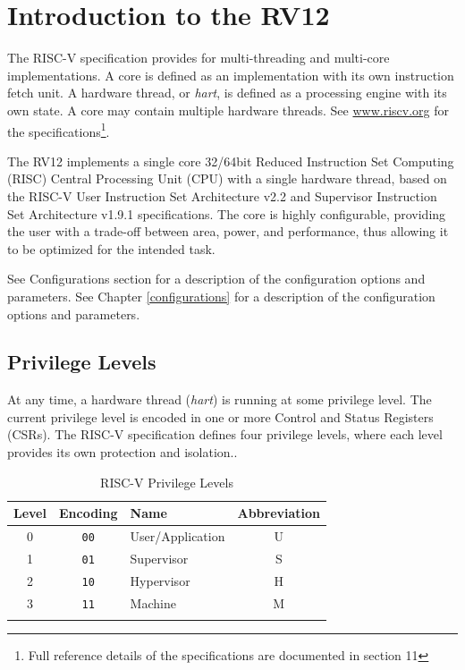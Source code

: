 \chapter{Introduction to the RV12} \label{introduction-to-the-rv12}

The RISC-V specification provides for multi-threading and multi-core implementations. 
A core is defined as an implementation with its own instruction fetch unit. 
A hardware thread, or \emph{hart}, is defined as a processing engine with its own state. 
A core may contain multiple hardware threads. 
See \href{http://www.riscv.org}{www.riscv.org} for the specifications\footnote{Full reference details of the specifications are documented in section 11}.

The RV12 implements a single core 32/64bit Reduced Instruction Set Computing (RISC) Central Processing Unit (CPU) with a single hardware thread, based on the RISC-V User Instruction Set Architecture v2.2 and Supervisor Instruction Set Architecture v1.9.1 specifications. 
The core is highly configurable, providing the user with a trade-off between area, power, and performance, thus allowing it to be optimized for the intended task.

\ifdefined\MARKDOWN
	See Configurations section for a description of the configuration options and parameters.
\else
	See Chapter \ref{configurations} for a description of the configuration options and parameters.
\fi

\section{Privilege Levels}\label{privilege-levels}

At any time, a hardware thread (\emph{hart}) is running at some privilege level. 
The current privilege level is encoded in one or more Control and Status Registers (CSRs). 
The RISC-V specification defines four privilege levels, where each level provides its own protection and isolation..

\begin{longtable}[]{@{}cclc@{}}
\toprule
Level & Encoding    & Name             & Abbreviation\tabularnewline
\midrule
\endhead
0     & \texttt{00} & User/Application & U\tabularnewline
1     & \texttt{01} & Supervisor       & S\tabularnewline
2     & \texttt{10} & Hypervisor       & H\tabularnewline
3     & \texttt{11} & Machine          & M\tabularnewline
\bottomrule
\caption{RISC-V Privilege Levels}
\label{tab:riscv-priv-levels}
\end{longtable}

